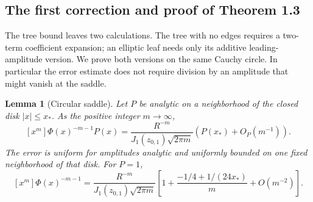 \documentclass[a4paper,10pt]{article}
\numberwithin{equation}{section}
\theoremstyle{paperplain}
\newtheorem{lmm}[thm]{Lemma}
\theoremstyle{paperremark}
\theoremstyle{paperplain}
\begin{document}
\subsection{The first correction and proof of Theorem 1.3}
\label{subsec:s06:04}

The tree bound leaves two calculations. The tree with no edges requires a
two-term coefficient expansion; an elliptic leaf needs only its
additive leading-amplitude version. We prove both versions on the
same Cauchy circle. In particular the error estimate does not require
division by an amplitude that might vanish at the saddle.

\begin{lmm}[Circular saddle]\label{lmm:s06:saddle}
Let $P$ be analytic on a neighborhood of the closed disk
$|x|\leq x_*$. As the positive integer $m\to\infty$,
\begin{equation}\label{eq:s06:additive-saddle}
 [x^m]\Phi(x)^{-m-1}P(x)
 =\frac{R^{-m}}{J_1(z_{0,1})\sqrt{2\pi m}}
             \left(P(x_*)+O_P(m^{-1})\right).
\end{equation}
The error is uniform for amplitudes analytic and uniformly bounded
on one fixed neighborhood of that disk. For $P=1$,
\begin{equation}\label{eq:s06:two-term-saddle}
 [x^m]\Phi(x)^{-m-1}
 =\frac{R^{-m}}{J_1(z_{0,1})\sqrt{2\pi m}}
 \left[1+\frac{-1/4+1/(24x_*)}{m}+O(m^{-2})\right].
\end{equation}
\end{lmm}
\end{document}
